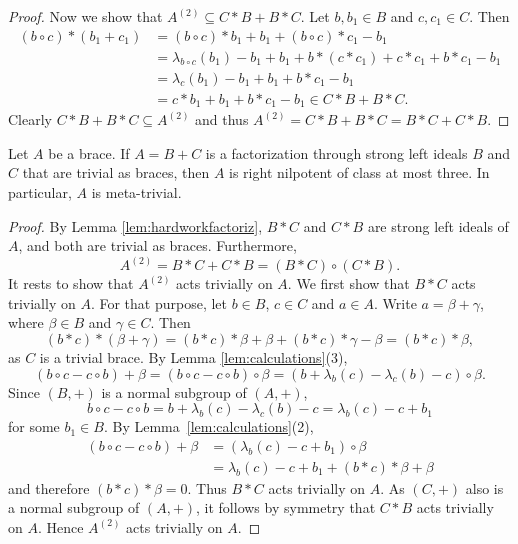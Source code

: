 \begin{proof}
Now we show that $A^{(2)} \subseteq C*B + B*C$. Let $b,b_1 \in B$ and $c,c_1 \in C$. Then
\begin{align*}
    (b\circ c)*(b_1+c_1) & =(b\circ c)*b_1 + b_1 + (b \circ c)*c_1 -b_1\\
                         & =\lambda_{b\circ c}(b_1) - b_1 + b_1 + b*(c*c_1) + c*c_1 + b*c_1 -b_1\\
                         & =\lambda_c(b_1) - b_1 +b_1 +b*c_1-b_1\\
                         & =c*b_1 + b_1 + b*c_1 -b_1 \in C*B+B*C.
\end{align*}
Clearly $C*B + B*C \subseteq A^{(2)}$ and thus $A^{(2)} = C*B+B*C=B*C + C*B$. 
\end{proof}


\begin{theorem} 
\label{thm:Ito_braces}
Let $A$ be a brace. If $A=B+C$ is a factorization through strong left ideals $B$ and $C$ that are trivial as  braces,
then $A$ is right nilpotent of class at most three. In particular, $A$ is meta-trivial.
\end{theorem}

\begin{proof}
By Lemma \ref{lem:hardworkfactoriz}, $B*C$ and $C*B$ are strong left ideals of $A$, and both are trivial as  braces. Furthermore, 
\[
A^{(2)} = B*C + C*B = (B*C) \circ (C*B).
\]
It rests to show that $A^{(2)}$ acts trivially on $A$. We first show that $B*C$ acts trivially on $A$. For that purpose, 
let $b\in B$, $c\in C$ and $a\in A$. Write $a=\beta+\gamma$, where $\beta\in B$ and $\gamma\in C$. Then
\[
(b*c)*(\beta+\gamma)=(b*c)*\beta+\beta+(b*c)*\gamma-\beta=(b*c)*\beta, 
\]
as $C$ is a trivial brace. By Lemma \ref{lem:calculations}(3), 
\[
(b\circ c - c\circ b) + \beta = (b\circ c - c \circ b) \circ \beta = (b + \lambda_b(c) - \lambda_c(b) - c) \circ \beta.
\]
Since $(B,+)$ is a normal subgroup of $(A,+)$, 
\[
b\circ c-c\circ b=b+\lambda_b(c)-\lambda_c(b)-c=\lambda_b(c)-c+b_1
\]
for some $b_1\in B$. By Lemma~\ref{lem:calculations}(2), 
\begin{align*}
    (b\circ c - c\circ b) + \beta & =(\lambda_b(c) - c + b_1) \circ \beta\\
                                  & =\lambda_b(c) - c + b_1 + (b*c)*\beta + \beta
\end{align*}
and therefore $(b*c)*\beta = 0$. Thus $B*C$ acts trivially on $A$. As $(C,+)$ also is a normal subgroup of $(A,+)$,
it follows by symmetry that $C*B$ acts trivially on $A$. Hence $A^{(2)}$ acts trivially on $A$.
\end{proof}

